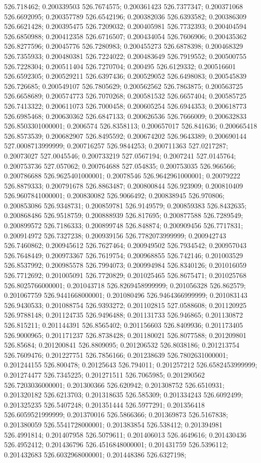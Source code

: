 526.718462; 0.200339503 526.7674575; 0.200361423 526.7377347; 0.200371068 526.6692095; 0.200357789 526.6542196; 0.200382036 526.6393582; 0.200386309 526.6621428; 0.200395475 526.7209032; 0.200405981 526.7732393; 0.200404594 526.6850988; 0.200412358 526.6716507; 0.200434054 526.7606906; 0.200435362 526.8277596; 0.20045776 526.7280983; 0.200455273 526.6878398; 0.200468329 526.7355933; 0.200480381 526.7224022; 0.200483649 526.7919552; 0.200500755 526.7228304; 0.200511404 526.7270704; 0.200495 526.6129332; 0.200516601 526.6592305; 0.200529211 526.6397436; 0.200529052 526.6498083; 0.200545839 526.726685; 0.200549107 526.7805629; 0.200562562 526.7863875; 0.200563725 526.6658689; 0.200574773 526.7070268; 0.200581532 526.6657404; 0.200585725 526.7413322; 0.200611073 526.7000458; 0.200605254 526.6944353; 0.200618773 526.6985468; 0.200630362 526.6847133; 0.200626536 526.7666009; 0.200632833 526.8503301000001; 0.2006574 526.8358113; 0.200657017 526.841636; 0.200665418 526.8573539; 0.200682907 526.8495592; 0.200674202 526.9643389; 0.200690144 527.0008713999999; 0.200716257 526.9844253; 0.200711363 527.0217287; 0.20073027 527.0045546; 0.200733219 527.0567194; 0.2007241 527.0145764; 0.200753736 527.057062; 0.200764688 527.054835; 0.200753035 526.966566; 0.200786688 526.9625401000001; 0.20078546 526.9642961000001; 0.20079222 526.8879333; 0.200791678 526.8863487; 0.200800844 526.923909; 0.200810409 526.9607841000001; 0.200830082 526.9066492; 0.200838945 526.970806; 0.200853086 526.9348731; 0.200859781 526.9149579; 0.200859383 526.8432635; 0.200868486 526.9518759; 0.200888939 526.817695; 0.200877588 526.7289549; 0.200899572 526.7186333; 0.200899748 526.848874; 0.200909456 526.7717831; 0.200914972 526.7327238; 0.200939156 526.7782073999999; 0.200942743 526.7460862; 0.200945612 526.7627464; 0.200949502 526.7934542; 0.200957043 526.7648449; 0.200973367 526.7619754; 0.200968855 526.742146; 0.201003529 526.8537992; 0.200985578 526.7994073; 0.200994984 526.8340126; 0.201016059 526.7712692; 0.201005091 526.7720829; 0.201025465 526.8675471; 0.201025768 526.8025766000001; 0.201043718 526.8269458999999; 0.201056328 526.862579; 0.201067759 526.9441668000001; 0.201080496 526.9464366999999; 0.201083143 526.9430533; 0.201088754 526.9393272; 0.201102815 527.0588608; 0.201120925 526.9788148; 0.201124735 526.9496488; 0.201131733 526.946865; 0.201130872 526.815211; 0.201144391 526.8565402; 0.201156603 526.8409936; 0.201173405 526.9000965; 0.201171237 526.8738428; 0.201180021 526.8077588; 0.201209801 526.85684; 0.201200841 526.8809095; 0.201206532 526.8038186; 0.201213754 526.7609476; 0.201227751 526.7856166; 0.201238639 526.7802631000001; 0.201244155 526.800478; 0.20125643 526.794011; 0.201257212 526.6582453999999; 0.201274477 526.7345225; 0.201271511 526.7065985; 0.201290562 526.7203036000001; 0.201300366 526.620942; 0.201308752 526.6510931; 0.201320182 526.6213703; 0.201318635 526.585309; 0.201334243 526.6092499; 0.201325235 526.5407248; 0.201351444 526.5977291; 0.201356418 526.6059521999999; 0.201370016 526.5866366; 0.201369873 526.5167838; 0.201380059 526.5541728000001; 0.201383854 526.538412; 0.201394981 526.4991814; 0.201407958 526.5079611; 0.201406013 526.4649616; 0.201430436 526.4952412; 0.201436796 526.4516848000001; 0.201431759 526.5396112; 0.201432683 526.6032968000001; 0.201448386 526.6327198; 